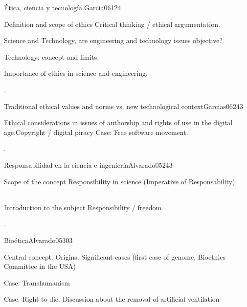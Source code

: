 \begin{syllabus}
\begin{unit}{}{Ética, ciencia y tecnología.}{Garcia06}{12}{4}
   \begin{topics}
      \item Definition and scope of ethics Critical thinking / ethical argumentation.
      \item Science and Technology, are engineering and technology issues objective?
      \item Technology: concept and limits.
      \item Importance of ethics in science and engineering.
   \end{topics}
   \begin{learningoutcomes}
      \item .
   \end{learningoutcomes}
\end{unit}

\begin{unit}{}{Traditional ethical values and norms vs. new technological context}{Garcias06}{24}{3}
   \begin{topics}
      \item Ethical considerations in issues of authorship and rights of use in the digital age.Copyright / digital piracy Case: Free software movement.
   \end{topics}

   \begin{learningoutcomes}
      \item .
      \end{learningoutcomes}
\end{unit}

\begin{unit}{}{Responsabilidad en la ciencia e ingeniería}{Alvarado05}{24}{3}
   \begin{topics}
      \item Scope of the concept Responsibility in science (Imperative of Responsability)
      \item Introduction to the subject Responsibility / freedom
   \end{topics}

   \begin{learningoutcomes}
      \item .
   \end{learningoutcomes}
\end{unit}

\begin{unit}{}{Bioética}{Alvarado05}{30}{3}
   \begin{topics}
      \item Central concept. Origins. Significant cases (first case of genome, Bioethics Committee in the USA)
      \item Case: Transhumanism
      \item Case: Right to die. Discussion about the removal of artificial ventilation
   \end{topics}


\end{unit}
\end{syllabus}
